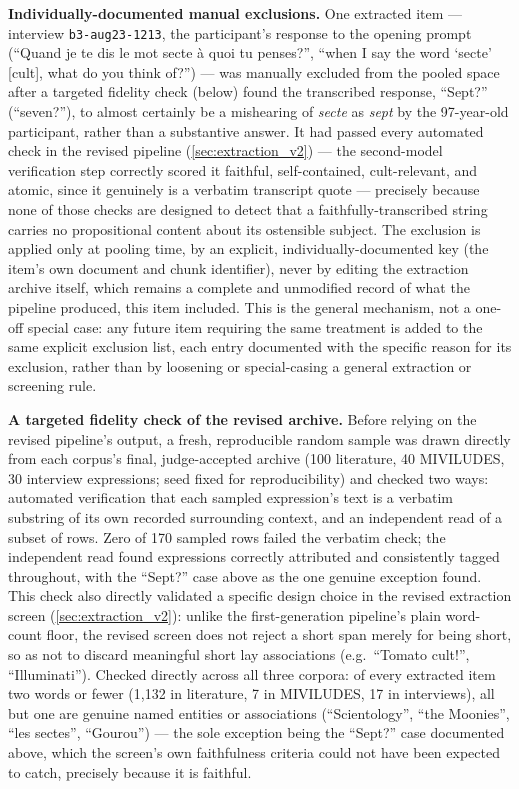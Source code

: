 \textbf{Individually-documented manual exclusions.} One extracted item — interview \texttt{b3-aug23-1213}, the participant's response to the opening prompt (\enquote{Quand je te dis le mot secte à quoi tu penses?}, \enquote{when I say the word `secte' [cult], what do you think of?}) — was manually excluded from the pooled space after a targeted fidelity check (below) found the transcribed response, \enquote{Sept?} (\enquote{seven?}), to almost certainly be a mishearing of \textit{secte} as \textit{sept} by the 97-year-old participant, rather than a substantive answer. It had passed every automated check in the revised pipeline (\ref{sec:extraction_v2}) — the second-model verification step correctly scored it faithful, self-contained, cult-relevant, and atomic, since it genuinely is a verbatim transcript quote — precisely because none of those checks are designed to detect that a faithfully-transcribed string carries no propositional content about its ostensible subject. The exclusion is applied only at pooling time, by an explicit, individually-documented key (the item's own document and chunk identifier), never by editing the extraction archive itself, which remains a complete and unmodified record of what the pipeline produced, this item included. This is the general mechanism, not a one-off special case: any future item requiring the same treatment is added to the same explicit exclusion list, each entry documented with the specific reason for its exclusion, rather than by loosening or special-casing a general extraction or screening rule.

\textbf{A targeted fidelity check of the revised archive.} Before relying on the revised pipeline's output, a fresh, reproducible random sample was drawn directly from each corpus's final, judge-accepted archive (100 literature, 40 MIVILUDES, 30 interview expressions; seed fixed for reproducibility) and checked two ways: automated verification that each sampled expression's text is a verbatim substring of its own recorded surrounding context, and an independent read of a subset of rows. Zero of 170 sampled rows failed the verbatim check; the independent read found expressions correctly attributed and consistently tagged throughout, with the \enquote{Sept?} case above as the one genuine exception found. This check also directly validated a specific design choice in the revised extraction screen (\ref{sec:extraction_v2}): unlike the first-generation pipeline's plain word-count floor, the revised screen does not reject a short span merely for being short, so as not to discard meaningful short lay associations (e.g.\ \enquote{Tomato cult!}, \enquote{Illuminati}). Checked directly across all three corpora: of every extracted item two words or fewer (1{,}132 in literature, 7 in MIVILUDES, 17 in interviews), all but one are genuine named entities or associations (\enquote{Scientology}, \enquote{the Moonies}, \enquote{les sectes}, \enquote{Gourou}) — the sole exception being the \enquote{Sept?} case documented above, which the screen's own faithfulness criteria could not have been expected to catch, precisely because it is faithful.

